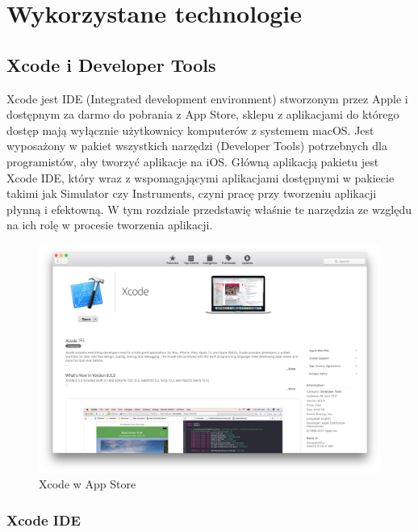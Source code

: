 \chapter{Wykorzystane technologie}

%

\section{Xcode i Developer Tools}
Xcode jest IDE (Integrated development environment) stworzonym przez Apple i dostępnym za darmo do pobrania z App Store, sklepu z aplikacjami do którego dostęp mają wyłącznie użytkownicy komputerów z systemem macOS. Jest wyposażony w pakiet wszystkich narzędzi (Developer Tools) potrzebnych dla programistów, aby tworzyć aplikacje na iOS. Główną aplikacją pakietu jest Xcode IDE, który wraz z wspomagającymi aplikacjami dostępnymi w pakiecie takimi jak Simulator czy Instruments, czyni pracę przy tworzeniu aplikacji płynną i efektowną. W tym rozdziale przedstawię właśnie te narzędzia ze względu na ich rolę w procesie tworzenia aplikacji.

\begin{figure}[ht!]
  \centering
  \includegraphics[width=120mm]{images/chapter-2-image-1-appstore.png}
  \caption{Xcode w App Store}
\end{figure}

\subsection{Xcode IDE}

